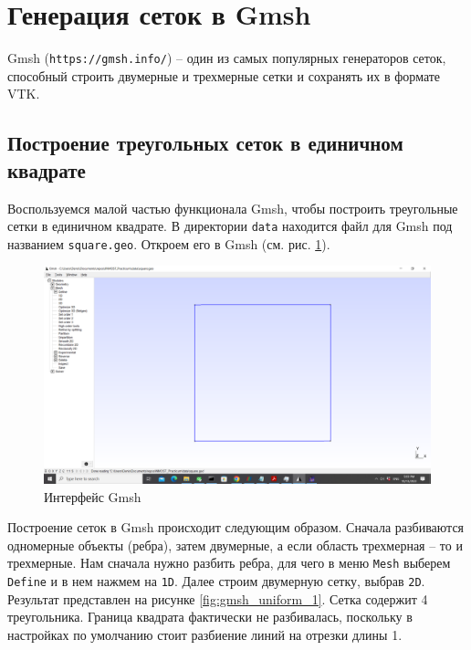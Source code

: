 \documentclass[a4paper, 11pt]{article}
\begin{document}
\section{Генерация сеток в Gmsh}
Gmsh (\texttt{https://gmsh.info/}) -- один из самых популярных генераторов сеток, способный строить двумерные и трехмерные сетки и сохранять их в формате VTK. 

\subsection{Построение треугольных сеток в единичном квадрате}
Воспользуемся малой частью функционала Gmsh, чтобы построить треугольные сетки в единичном квадрате.
В директории \texttt{data} находится файл для Gmsh под названием \texttt{square.geo}. Откроем его в Gmsh (см. рис. \ref{fig:gmsh_gui}).

\begin{figure}[h] \centering
	\includegraphics[scale=0.4]{gmsh_gui.png}
	\caption{Интерфейс Gmsh\label{fig:gmsh_gui}}
\end{figure}

Построение сеток в Gmsh происходит следующим образом. Сначала разбиваются одномерные объекты (ребра), затем двумерные, а если область трехмерная -- то и трехмерные. Нам сначала нужно разбить ребра, для чего в меню \texttt{Mesh} выберем \texttt{Define} и в нем нажмем на \texttt{1D}. Далее строим двумерную сетку, выбрав \texttt{2D}. Результат представлен на рисунке \ref{fig:gmsh_uniform_1}. Сетка содержит 4 треугольника. Граница квадрата фактически не разбивалась, поскольку в настройках по умолчанию стоит разбиение линий на отрезки длины 1. 
\end{document}
